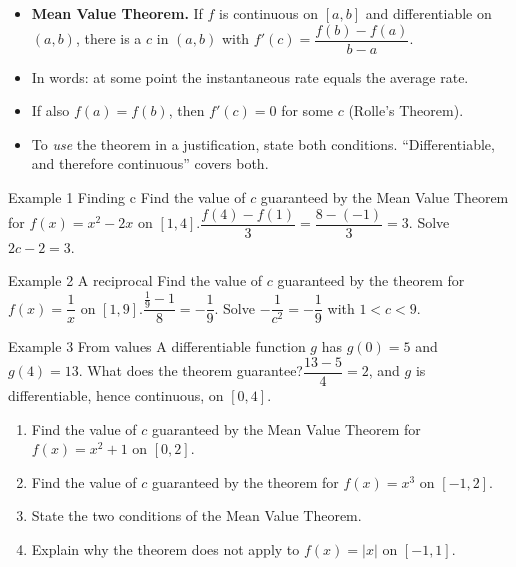 \documentclass[11pt]{article}
\begin{document}

\begin{ideabox}
\begin{itemize}[leftmargin=*,itemsep=2pt,topsep=2pt]
  \item \textbf{Mean Value Theorem.} If $f$ is continuous on $[a,b]$ and differentiable on $(a,b)$, there is a $c$ in $(a,b)$ with $f'(c)=\dfrac{f(b)-f(a)}{b-a}$.
  \item In words: at some point the instantaneous rate equals the average rate.
  \item If also $f(a)=f(b)$, then $f'(c)=0$ for some $c$ (Rolle's Theorem).
  \item To \emph{use} the theorem in a justification, state both conditions. \textquotedblleft{}Differentiable, and therefore continuous\textquotedblright{} covers both.
\end{itemize}
\end{ideabox}

\begin{example}{Example 1 \textperiodcentered{} Finding c}
Find the value of $c$ guaranteed by the Mean Value Theorem for $f(x)=x^2-2x$ on $[1,4]$.\soln $\dfrac{f(4)-f(1)}{3}=\dfrac{8-(-1)}{3}=3$. Solve $2c-2=3$.
\end{example}

\begin{example}{Example 2 \textperiodcentered{} A reciprocal}
Find the value of $c$ guaranteed by the theorem for $f(x)=\dfrac1x$ on $[1,9]$.\soln $\dfrac{\frac19-1}{8}=-\dfrac19$. Solve $-\dfrac{1}{c^2}=-\dfrac19$ with $1<c<9$.
\end{example}

\begin{example}{Example 3 \textperiodcentered{} From values}
A differentiable function $g$ has $g(0)=5$ and $g(4)=13$. What does the theorem guarantee?\soln $\dfrac{13-5}{4}=2$, and $g$ is differentiable, hence continuous, on $[0,4]$.
\end{example}

\newpage
{}

\begin{enumerate}[leftmargin=*,itemsep=2pt]
  \item Find the value of $c$ guaranteed by the Mean Value Theorem for $f(x)=x^2+1$ on $[0,2]$.\work{2.3cm}
  \item Find the value of $c$ guaranteed by the theorem for $f(x)=x^3$ on $[-1,2]$.\work{2.3cm}
  \item State the two conditions of the Mean Value Theorem.\work{2.3cm}
  \item Explain why the theorem does not apply to $f(x)=|x|$ on $[-1,1]$.\work{2.3cm}
\end{enumerate}
\end{document}
